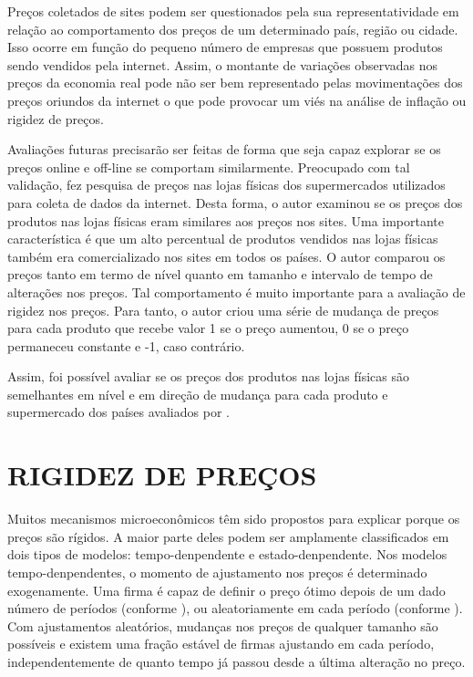 \documentclass[twoside,a4paper,11pt]{report}
\begin{document}
Preços coletados de sites podem ser questionados pela sua representatividade em relação ao comportamento dos preços de um determinado país, região ou cidade. Isso ocorre em função do pequeno número de empresas que possuem produtos sendo vendidos pela internet. Assim, o montante de variações observadas nos preços da economia real pode não ser bem representado pelas movimentações dos preços oriundos da internet o que pode provocar um viés na análise de inflação ou rigidez de preços. 

  Avaliações futuras precisarão ser feitas de forma que seja capaz explorar se os preços online e off-line se comportam similarmente. Preocupado com tal validação, \citet{cavallo2010scraped} fez pesquisa de preços nas lojas físicas dos supermercados utilizados para coleta de dados da internet. Desta forma, o autor examinou se os preços dos produtos nas lojas físicas eram similares aos preços nos sites. Uma importante característica é que um alto percentual de produtos vendidos nas lojas físicas também era comercializado nos sites em todos os países. O autor comparou os preços tanto em termo de nível quanto em tamanho e intervalo de tempo de alterações nos preços. Tal comportamento é muito importante para a avaliação de rigidez nos preços. Para tanto, o autor criou uma série de mudança de preços para cada produto que recebe valor 1 se o preço aumentou, 0 se o preço permaneceu constante e -1, caso contrário. 
  
  Assim, foi possível avaliar se os preços dos produtos nas lojas físicas são semelhantes em nível e em direção de mudança para cada produto e supermercado dos países avaliados por \citet{cavallo2010scraped}.

\section*{RIGIDEZ DE PREÇOS}

Muitos mecanismos microeconômicos têm sido propostos para explicar porque os preços são rígidos. A maior parte deles podem ser amplamente classificados em dois tipos de modelos: tempo-denpendente e estado-denpendente. Nos modelos tempo-denpendentes, o momento de ajustamento nos preços é determinado exogenamente. Uma firma é capaz de definir o preço ótimo depois de um dado número de períodos (conforme \citet{taylor1980aggregate}), ou aleatoriamente em cada período (conforme \citet{calvo1983staggered}). Com ajustamentos aleatórios, mudanças nos preços de qualquer tamanho são possíveis e existem uma fração estável de firmas ajustando em cada período, independentemente de quanto tempo já passou desde a última alteração no preço. 
\end{document}
